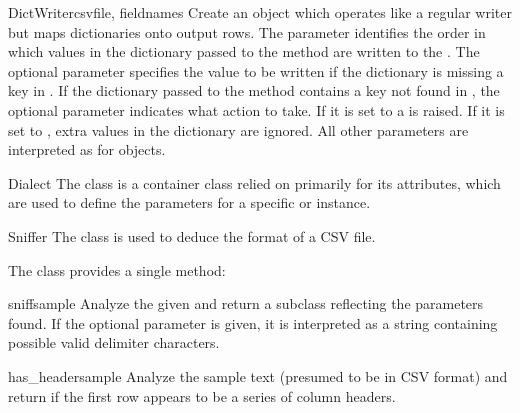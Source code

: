 \begin{classdesc}{DictWriter}{csvfile, fieldnames}
Create an object which operates like a regular writer but maps dictionaries
onto output rows.  The  parameter identifies the order in
which values in the dictionary passed to the  method are
written to the .  The optional  parameter
specifies the value to be written if the dictionary is missing a key in
.  If the dictionary passed to the 
method contains a key not found in , the optional
 parameter indicates what action to take.  If it is set
to  a  is raised.  If it is set to
, extra values in the dictionary are ignored.  All other
parameters are interpreted as for  objects.
\end{classdesc}

\begin{classdesc*}{Dialect}{}
The  class is a container class relied on primarily for its
attributes, which are used to define the parameters for a specific
 or  instance.
\end{classdesc*}

\begin{classdesc}{Sniffer}{}
The  class is used to deduce the format of a CSV file.
\end{classdesc}

The  class provides a single method:

\begin{methoddesc}{sniff}{sample}
Analyze the given  and return a  subclass
reflecting the parameters found.  If the optional  parameter
is given, it is interpreted as a string containing possible valid delimiter
characters.
\end{methoddesc}

\begin{methoddesc}{has_header}{sample}
Analyze the sample text (presumed to be in CSV format) and return
 if the first row appears to be a series of column
headers.
\end{methoddesc}


